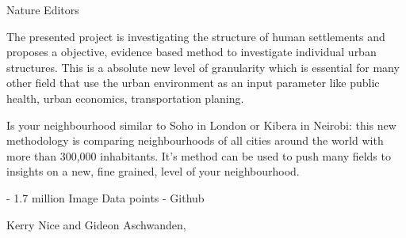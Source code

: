 \documentclass[11pt]{letter} %
\begin{document}
\begin{letter}{Nature Editors
}

The presented project is investigating the structure of human settlements and proposes a objective, evidence based method to investigate individual urban structures. This is a absolute new level of granularity which is essential for many other field that use the urban environment as an input parameter like public health, urban economics, transportation planing.

Is your neighbourhood similar to Soho in London or Kibera in Neirobi: this new methodology is comparing neighbourhoods of all cities around the world with more than 300,000 inhabitants. It's method can be used to push many fields to insights on a new, fine grained, level of your neighbourhood. 


- 1.7 million Image Data points
- Github


\closing{Kerry Nice and Gideon Aschwanden,}




\end{letter}
\end{document}
